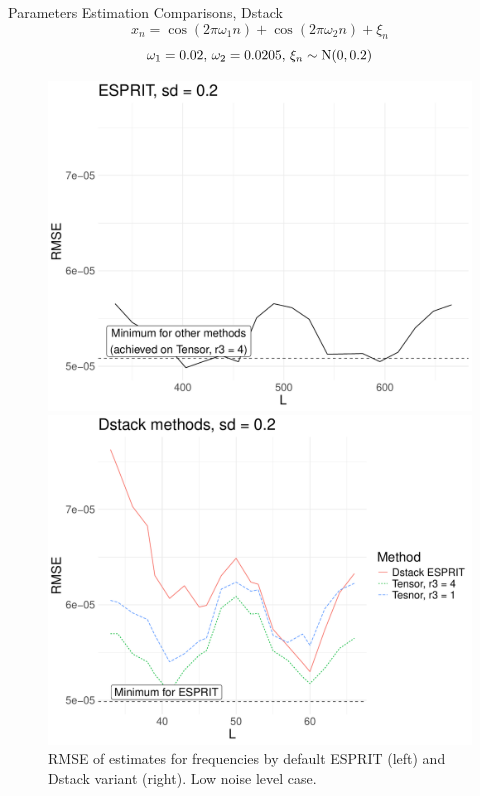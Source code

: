 \documentclass[pdf, unicode, ucs, notheorems]{beamer}
\theoremstyle{definition}
\begin{document}
\begin{frame}{Parameters Estimation Comparisons, Dstack}
  \vspace*{-0.3cm}
  \[
    x_{n} = \cos(2 \pi \omega_1 n) +
    \cos(2 \pi \omega_2 n) + \xi_n
  \]
  \[\omega_1 = 0.02,\, \omega_2 = 0.0205,\, \xi_n \sim \mathrm{N}(0, 0.2)\]

  \begin{figure}[!ht]
    \begin{minipage}{0.48\textwidth}
      \centering
      \includegraphics[width=\textwidth]{img/htlsd_byL_real_param_rmse_esprit_2.pdf}
    \end{minipage}
    \begin{minipage}{0.48\textwidth}
      \centering
      \includegraphics[width=\textwidth]{img/htlsd_byL_real_param_rmse_dstack_2.pdf}
    \end{minipage}
    \caption{RMSE of estimates for frequencies by default ESPRIT
    (left) and Dstack variant (right). Low noise level case.}
  \end{figure}
\end{frame}
\end{document}

